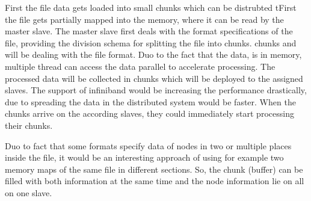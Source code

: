 First the file data gets loaded into small chunks which can be distrubted tFirst the file gets partially mapped into the memory, where it can be read by the master slave. The master slave first deals with the format specifications of the file, providing the division schema for splitting the file into chunks. chunks and will be dealing with the file format. Duo to the fact that the data, is in memory, multiple thread can access the data parallel to accelerate processing. The processed data will be collected in chunks which will be deployed to the assigned slaves.
The support of infiniband would be increasing the performance drastically, due to spreading the data in the distributed system would be faster.
When the chunks arrive on the according slaves, they could immediately start processing their chunks.
 
Duo to fact that some formats specify data of nodes in two or multiple places inside the file, it would be an interesting approach of using for example two memory maps of the same file in different sections. So, the chunk (buffer) can be filled with both information at the same time and the node information lie on all on one slave.

